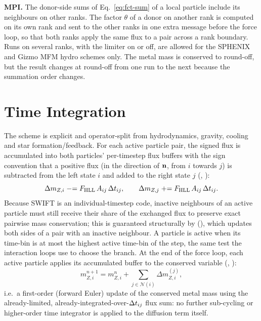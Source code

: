 \textbf{MPI.}
The donor-side sums of Eq.~\eqref{eq:fct-sum} of a local particle include
its neighbours on other ranks. The factor $\theta$ of a donor on another
rank is computed on its own rank and sent to the other ranks in one extra
message before the force loop, so that both ranks apply the same flux to a
pair across a rank boundary. Runs on several ranks, with the limiter on or
off, are allowed for the SPHENIX and Gizmo MFM hydro schemes only. The
metal mass is conserved to round-off, but the result changes at round-off
from one run to the next because the summation order changes.

\section{Time Integration}
\label{sec:time-integration}

The scheme is explicit and operator-split from hydrodynamics, gravity,
cooling and star formation/feedback. For each active particle pair, the
signed flux is accumulated into both particles' per-timestep flux
buffers with the sign convention that a positive flux (in the direction
of $\mathbf{n}$, from $i$ towards $j$) is subtracted from the left state $i$
and added to the right state $j$
(,
):
\begin{equation}
  \Delta m_{Z,i} \mathrel{-}= F_{\rm HLL}\,A_{ij}\, \Delta t_{ij} , \qquad
  \Delta m_{Z,j} \mathrel{+}= F_{\rm HLL}\,A_{ij}\, \Delta t_{ij} .
\end{equation}
Because SWIFT is an individual-timestep code, inactive neighbours of an
active particle must still receive their share of the exchanged flux to
preserve exact pairwise mass conservation; this is guaranteed structurally
by 
(), which updates both sides of a pair with an
inactive neighbour. A particle is active when its time-bin is at most the
highest active time-bin of the step, the same test the interaction loops
use to choose the branch. At the end of the force loop, each active
particle applies its accumulated buffer to the conserved variable
(, ):
\begin{equation}
  m_{Z,i}^{n+1} = m_{Z,i}^{n} + \sum_{j\in\mathcal N(i)} \Delta m_{Z,i}^{(j)} ,
\end{equation}
i.e.\ a first-order (forward Euler) update of the conserved metal mass
using the already-limited, already-integrated-over-$\Delta t_{ij}$ flux sum:
no further sub-cycling or higher-order time integrator is applied to the
diffusion term itself.

